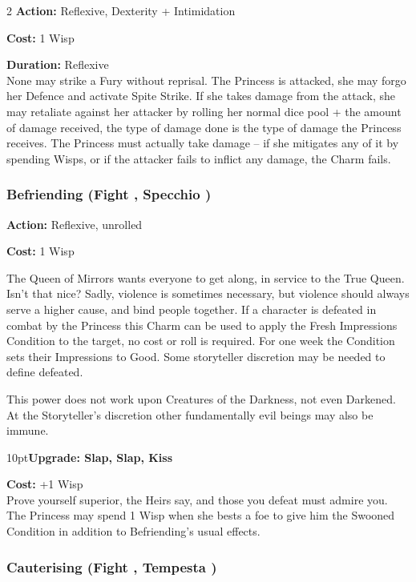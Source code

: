 \begin{multicols}{2}
\noindent \textbf{Action:} Reflexive, Dexterity + Intimidation

\noindent \textbf{Cost:} 1 Wisp

\noindent \textbf{Duration:} Reflexive\\

\noindent None may strike a Fury without reprisal. The Princess is attacked, she may forgo her Defence and activate Spite Strike. If she takes damage from the attack, she may retaliate against her attacker by rolling her normal dice pool + the amount of damage received, the type of damage done is the type of damage the Princess receives. The Princess must actually take damage -- if she mitigates any of it by spending Wisps, or if the attacker fails to inflict any damage, the Charm fails.

\subsubsection*{Befriending (Fight \textbullet\textbullet, Specchio \textbullet\textbullet)}

\noindent \textbf{Action:} Reflexive, unrolled

\noindent \textbf{Cost:} 1 Wisp

\noindent The Queen of Mirrors wants everyone to get along, in service to the True Queen. Isn't that nice? Sadly, violence is sometimes necessary, but violence should always serve a higher cause, and bind people together. If a character is defeated in combat by the Princess this Charm can be used to apply the Fresh Impressions Condition to the target, no cost or roll is required. For one week the Condition sets their Impressions to Good. Some storyteller discretion may be needed to define defeated.

This power does not work upon Creatures of the Darkness, not even Darkened. At the Storyteller's discretion other fundamentally evil beings may also be immune. 

\begin{myindentpar}{10pt}\textbf{Upgrade: Slap, Slap, Kiss}

\textbf{Cost:} +1 Wisp\\

\noindent Prove yourself superior, the Heirs say, and those you defeat must admire you. The Princess may spend 1 Wisp when she bests a foe to give him the Swooned Condition in addition to Befriending's usual effects. \end{myindentpar}

\subsubsection*{Cauterising (Fight \textbullet\textbullet, Tempesta \textbullet\textbullet\textbullet)}


\end{multicols}
